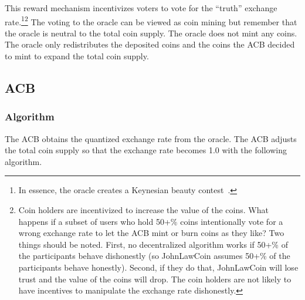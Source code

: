 \documentclass[dvipdfmx,a4paper]{article}
\begin{document}
This reward mechanism incentivizes voters to vote for the ``truth'' exchange rate.\footnote{In essence, the oracle creates a Keynesian beauty contest~\cite{gao2008keynesian}.}\footnote{Coin holders are incentivized to increase the value of the coins. What happens if a subset of users who hold 50+\% coins intentionally vote for a wrong exchange rate to let the ACB mint or burn coins as they like? Two things should be noted. First, no decentralized algorithm works if 50+\% of the participants behave dishonestly (so JohnLawCoin assumes 50+\% of the participants behave honestly). Second, if they do that, JohnLawCoin will lose trust and the value of the coins will drop. The coin holders are not likely to have incentives to manipulate the exchange rate dishonestly.} The voting to the oracle can be viewed as coin mining but remember that the oracle is neutral to the total coin supply. The oracle does not mint any coins. The oracle only redistributes the deposited coins and the coins the ACB decided to mint to expand the total coin supply.

\subsection{ACB}

\subsubsection{Algorithm}

The ACB obtains the quantized exchange rate from the oracle. The ACB adjusts the total coin supply so that the exchange rate becomes 1.0 with the following algorithm.
\end{document}
